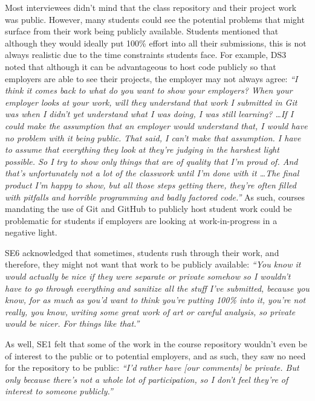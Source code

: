 Most interviewees didn't mind that the class repository and their project work was public. However, many students could see the potential problems that might surface from their work being publicly available. Students mentioned that although they would ideally put 100\% effort into all their submissions, this is not always realistic due to the time constraints students face. For example, DS3 noted that although it can be advantageous to host code publicly so that employers are able to see their projects, the employer may not always agree: \textit{``I think it comes back to what do you want to show your employers? When your employer looks at your work, will they understand that work I submitted in Git was when I didn't yet understand what I was doing, I was still learning? \ldots If I could make the assumption that an employer would understand that, I would have no problem with it being public. That said, I can't make that assumption. I have to assume that everything they look at they're judging in the harshest light possible. So I try to show only things that are of quality that I'm proud of. And that's unfortunately not a lot of the classwork until I'm done with it \ldots The final product I'm happy to show, but all those steps getting there, they're often filled with pitfalls and horrible programming and badly factored code.''} As such, courses mandating the use of Git and GitHub to publicly host student work could be problematic for students if employers are looking at work-in-progress in a negative light.

SE6 acknowledged that sometimes, students rush through their work, and therefore, they might not want that work to be publicly available: \textit{``You know it would actually be nice if they were separate or private somehow so I wouldn't have to go through everything and sanitize all the stuff I've submitted, because you know, for as much as you'd want to think you're putting 100\% into it, you're not really, you know, writing some great work of art or careful analysis, so private would be nicer. For things like that.''}

As well, SE1 felt that some of the work in the course repository wouldn't even be of interest to the public or to potential employers, and as such, they saw no need for the repository to be public: \textit{``I'd rather have [our comments] be private. But only because there's not a whole lot of participation, so I don't feel they're of interest to someone publicly.''}


